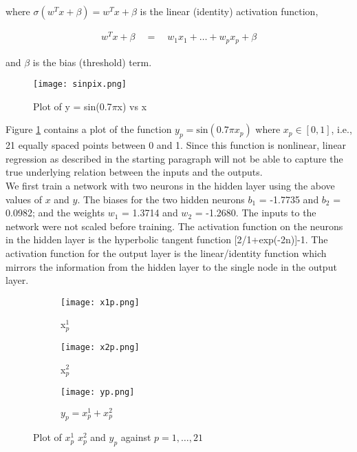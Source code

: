 \documentclass[paper=a4, fontsize=11pt]{scrartcl} %
\numberwithin{equation}{section} %
\begin{document}
where $\sigma(w^Tx+\beta) = w^Tx+\beta$ is the linear (identity) activation function, 

\begin{align}
w^Tx + \beta \quad = \quad w_1x_1 + \ldots + w_px_p + \beta
\end{align}

and $\beta$ is the bias (threshold) term. 

\begin{figure}[ht]
\centering
\texttt{[image: sinpix.png]}
\caption{Plot of y = sin(0.7$\pi$x) vs x}
\label{sinpix}
\end{figure}

Figure \ref{sinpix} contains a plot of the function $y_p = \textrm{sin}(0.7 \pi x_p)$ where $x_p \in [0,1]$, i.e., 21 equally spaced points between 0 and 1. Since this function is nonlinear, linear regression as described in the starting paragraph will not be able to capture the true underlying relation between the inputs and the outputs.\\

We first train a network with two neurons in the hidden layer using the above values of $x$ and $y.$ The biases for the two hidden neurons $b_1$ = -1.7735 and $b_2$ = 0.0982; and the weights $w_1$ = 1.3714 and $w_2$ = -1.2680. The inputs to the network were not scaled before training. The activation function on the neurons in the hidden layer is the hyperbolic tangent function [2/1+exp(-2n)]-1. The activation function for the output layer is the linear/identity function which mirrors the information from the hidden layer to the single node in the output layer.\\

\begin{figure}[ht]
\centering
	\begin{subfigure}[b]{0.3\textwidth}
	\texttt{[image: x1p.png]}
	\caption{x$_p^1$}
	\end{subfigure}
	\begin{subfigure}[b]{0.3\textwidth}
	\texttt{[image: x2p.png]}
	\caption{x$_p^2$}
	\end{subfigure}
		\begin{subfigure}[b]{0.3\textwidth}
	\texttt{[image: yp.png]}
	\caption{$y_p = x_p^1 + x_p^2$}
	\end{subfigure}
\caption{Plot of $x_p^1$ $x_p^2$ and $y_p$ against $p = 1, \ldots,21$}
\label{xp}
\end{figure}
\end{document}
